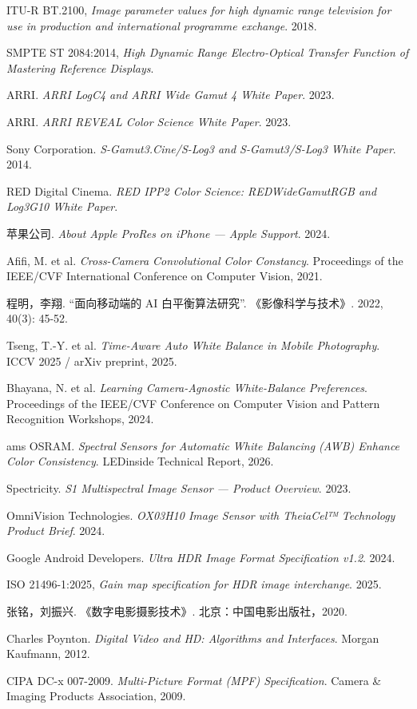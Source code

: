 \documentclass[12pt, a4paper]{ctexart}
\begin{document}
{\songti{}
\begin{enumerate}[label={[\arabic*]}]
    \item ITU-R BT.2100, \textit{Image parameter values for high dynamic range television for use in production and international programme exchange}. 2018.
    \item SMPTE ST 2084:2014, \textit{High Dynamic Range Electro-Optical Transfer Function of Mastering Reference Displays}.
    \item ARRI. \textit{ARRI LogC4 and ARRI Wide Gamut 4 White Paper}. 2023.
    \item ARRI. \textit{ARRI REVEAL Color Science White Paper}. 2023.
    \item Sony Corporation. \textit{S-Gamut3.Cine/S-Log3 and S-Gamut3/S-Log3 White Paper}. 2014.
    \item RED Digital Cinema. \textit{RED IPP2 Color Science: REDWideGamutRGB and Log3G10 White Paper}.
    \item 苹果公司. \textit{About Apple ProRes on iPhone — Apple Support}. 2024.
    \item Afifi, M. et al. \textit{Cross-Camera Convolutional Color Constancy}. Proceedings of the IEEE/CVF International Conference on Computer Vision, 2021.
    \item 程明，李翔. “面向移动端的 AI 白平衡算法研究”. 《影像科学与技术》. 2022, 40(3): 45-52.
    \item Tseng, T.-Y. et al. \textit{Time-Aware Auto White Balance in Mobile Photography}. ICCV 2025 / arXiv preprint, 2025.
    \item Bhayana, N. et al. \textit{Learning Camera-Agnostic White-Balance Preferences}. Proceedings of the IEEE/CVF Conference on Computer Vision and Pattern Recognition Workshops, 2024.
    \item ams OSRAM. \textit{Spectral Sensors for Automatic White Balancing (AWB) Enhance Color Consistency}. LEDinside Technical Report, 2026.
    \item Spectricity. \textit{S1 Multispectral Image Sensor — Product Overview}. 2023.
    \item OmniVision Technologies. \textit{OX03H10 Image Sensor with TheiaCel™ Technology Product Brief}. 2024.
    \item Google Android Developers. \textit{Ultra HDR Image Format Specification v1.2}. 2024.
    \item ISO 21496-1:2025, \textit{Gain map specification for HDR image interchange}. 2025.
    \item 张铭，刘振兴. 《数字电影摄影技术》. 北京：中国电影出版社，2020.
    \item Charles Poynton. \textit{Digital Video and HD: Algorithms and Interfaces}. Morgan Kaufmann, 2012.
    \item CIPA DC-x 007-2009. \textit{Multi-Picture Format (MPF) Specification}. Camera \& Imaging Products Association, 2009.
\end{enumerate}
}
\end{document}
